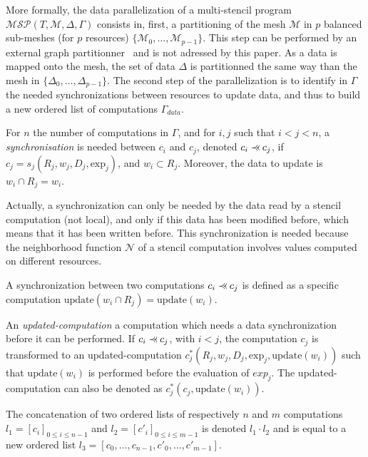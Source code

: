 More formally, the data parallelization of a multi-stencil program $\mathcal{MSP}(T,\mathcal{M},\Delta,\Gamma)$ consists in, first, a partitioning of the mesh $\mathcal{M}$ in $p$ balanced sub-meshes (for $p$ resources) $\{\mathcal{M}_0,\dots,\mathcal{M}_{p-1}\}$. This step can be performed by an external graph partitionner~\cite{} and is not adressed by this paper. As a data is mapped onto the mesh, the set of data $\Delta$ is partitionned the same way than the mesh in $\{\Delta_0,\dots,\Delta_{p-1}\}$. The second step of the parallelization is to identify in $\Gamma$ the needed synchronizations between resources to update data, and thus to build a new ordered list of computations $\Gamma_{data}$.

\begin{mydef}
For $n$ the number of computations in $\Gamma$, and for $i,j$ such that $i<j<n$, a \textit{synchronisation} is needed between $c_i$ and $c_j$, denoted $c_i \pprec c_j$, if $c_j=s_j(R_j,w_j,D_j,\text{exp}_j)$, and $w_i \subset R_j$. Moreover, the data to update is $w_i \cap R_j = w_i$.
\end{mydef}

Actually, a synchronization can only be needed by the data read by a stencil computation (not local), and only if this data has been modified before, which means that it has been written before. This synchronization is needed because the neighborhood function $\mathcal{N}$ of a stencil computation involves values computed on different resources.

\begin{mydef}
A synchronization between two computations $c_i \pprec c_j$ is defined as a specific computation $\text{update}(w_i \cap R_j)=\text{update}(w_i)$.
\end{mydef}

\begin{mydef}
An \textit{updated-computation} a computation which needs a data synchronization before it can be performed. If $c_i \pprec c_j$, with $i<j$, the computation $c_j$ is transformed to an updated-computation $c^*_j(R_j,w_j,D_j,\text{exp}_j,\text{update}(w_i))$ such that $\text{update}(w_i)$ is performed before the evaluation of $exp_j$. The updated-computation can also be denoted as $c^*_j(c_j,\text{update}(w_i))$.
\end{mydef}

\begin{mydef}
The concatenation of two ordered lists of respectively $n$ and $m$ computations $l_1=[c_i]_{0 \leq i \leq n-1}$ and $l_2=[c'_i]_{0 \leq i \leq m-1}$ is denoted $l_1 \cdot l_2$ and is equal to a new ordered list $l_3=[c_0,\dots,c_{n-1},c'_0,\dots,c'_{m-1}]$.
\end{mydef}

